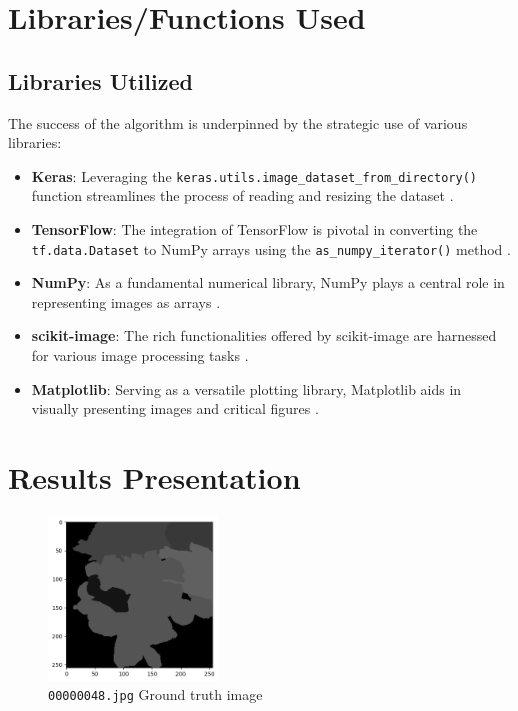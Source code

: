 \documentclass[conference]{IEEEtran}
\begin{document}
 	\section{Libraries/Functions Used}
 	
 	\subsection{Libraries Utilized}
 	
 	The success of the algorithm is underpinned by the strategic use of various libraries:
 	
 	\begin{itemize}
 		\item \textbf{Keras}: Leveraging the \texttt{keras.utils.image\_dataset\_from\_directory()} function streamlines the process of reading and resizing the dataset \cite{chollet2015keras}.
 		
 		\item \textbf{TensorFlow}: The integration of TensorFlow is pivotal in converting the \texttt{tf.data.Dataset} to NumPy arrays using the \texttt{as\_numpy\_iterator()} method \cite{tensorflow2015-whitepaper}.
 		
 		\item \textbf{NumPy}: As a fundamental numerical library, NumPy plays a central role in representing images as arrays \cite{harris2020array}.
 		
 		\item \textbf{scikit-image}: The rich functionalities offered by scikit-image are harnessed for various image processing tasks \cite{scikit-image}.
 		
 		\item \textbf{Matplotlib}: Serving as a versatile plotting library, Matplotlib aids in visually presenting images and critical figures \cite{Hunter:2007}.
 	\end{itemize}
 	
 	\section{Results Presentation}
 	
 	\begin{figure}[htbp]
 		\centerline{\includegraphics[width = 0.4\textwidth]{groundtruth.png}}
 		\caption{\texttt{00000048.jpg} Ground truth image}
 		\label{fig:groundtruth}
 	\end{figure}
 	
\end{document}
